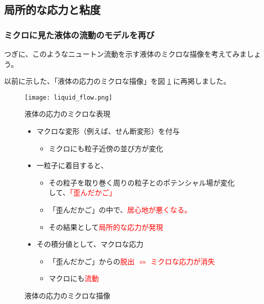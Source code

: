 \documentclass[uplatex,dvipdfmx,a4paper,11pt]{jsarticle}
\begin{document}
\subsection{局所的な応力と粘度}

\subsubsection{ミクロに見た液体の流動のモデルを再び}

つぎに、このようなニュートン流動を示す液体のミクロな描像を考えてみましょう。

以前に示した、「液体の応力のミクロな描像」を図 \ref{fig:stress_micro} に再掲しました。
\begin{figure}[htb]
	\begin{center}
		\begin{minipage}{0.9\textwidth}
			\begin{center}
				\texttt{[image: liquid\_flow.png]}
			\end{center}
		\end{minipage}
		\begin{minipage}{0.9\textwidth}
			\begin{center}
				\begin{itembox}[l]{液体の応力のミクロな表現}
					\begin{itemize}
						\item マクロな変形（例えば、せん断変形）を付与
						\begin{itemize}
							\item ミクロにも粒子近傍の並び方が変化
						\end{itemize}
						\item 一粒子に着目すると、
						\begin{itemize}
							\item その粒子を取り巻く周りの粒子とのポテンシャル場が変化して、\textcolor{red}{「歪んだかご」}
							\item 「歪んだかご」の中で、\textcolor{red}{居心地が悪くなる。}
							\item その結果として\textcolor{red}{局所的な応力が発現}
						\end{itemize}
						\item その積分値として、マクロな応力
						\begin{itemize}
							\item 「歪んだかご」からの\textcolor{red}{脱出 $\Leftrightarrow$ ミクロな応力が消失 }
							\item マクロにも\textcolor{red}{流動}
						\end{itemize}
					\end{itemize}
				\end{itembox}
			\end{center}
		\end{minipage}
		\caption{液体の応力のミクロな描像}
		\label{fig:stress_micro}
	\end{center}
\end{figure}
\end{document}

